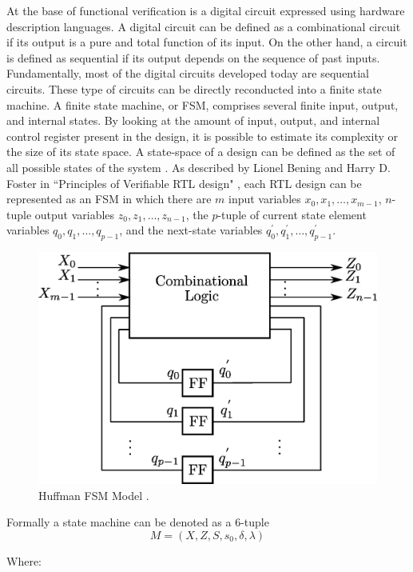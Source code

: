 At the base of functional verification is a digital circuit expressed using
hardware description languages. A digital circuit can be defined as a
combinational circuit if its output is a pure and total function of its input.
On the other hand, a circuit is defined as sequential if its output depends on
the sequence of past inputs. Fundamentally, most of the digital circuits
developed today are sequential circuits. These type of circuits can be directly
reconducted into a finite state machine. A finite state machine, or FSM,
comprises several finite input, output, and internal states. By looking at the
amount of input, output, and internal control register present in the design, it
is possible to estimate its complexity or the size of its state space. A
state-space of a design can be defined as the set of all possible states of the
system \cite{definitionofstatespace}. As described by Lionel Bening and Harry D.
Foster in ``Principles of Verifiable RTL design" \cite{bening2001principles},
each RTL design can be represented as an FSM in which there are $m$ input
variables $x_0, x_1, \dots, x_{m-1}$, $n$-tuple output variables $z_0, z_1,
\dots, z_{n-1}$, the $p$-tuple of current state element variables $q_0, q_1,
\dots, q_{p-1}$, and the next-state variables $q_0^{'}, q_1^{'}, \dots,
q_{p-1}^{'}$.

\begin{figure}[htb]
\centering
\includegraphics[width=0.6\linewidth]{pictures/Huffman_FSM.eps}
\caption{Huffman FSM Model \cite{bening2001principles}.}
\label{fig:huffmanfsm}
\end{figure}
Formally a state machine can be denoted as a 6-tuple
\begin{equation*}
    M = (X,Z,S,s_0,\delta,\lambda)
\end{equation*}

Where:


